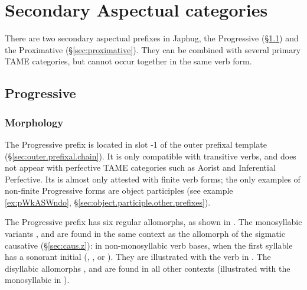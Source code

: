  \section{Secondary Aspectual categories} \label{sec:second.aspect}
There are two secondary aspectual prefixes in Japhug, the Progressive (§\ref{sec:progressive}) and the Proximative (§\ref{sec:proximative}). They can be combined with several primary TAME categories, but cannot occur together in the same verb form. 

\subsection{Progressive} \label{sec:progressive}

\subsubsection{Morphology} \label{sec:progressive.morphology}
The Progressive prefix  is located in slot -1 of the outer prefixal template (§\ref{sec:outer.prefixal.chain}). It is only compatible with transitive verbs, and does not appear with perfective TAME categories such as Aorist and Inferential Perfective. Its is almost only attested with finite verb forms; the only examples of non-finite Progressive forms are object participles (see example \ref{ex:pWkASWndo}, §\ref{sec:object.participle.other.prefixes}).

The Progressive prefix has six regular allomorphs, as shown in . The monosyllabic variants ,  and  are found in the same context as the  allomorph of the sigmatic causative (§\ref{sec:caus.z}): in non-monosyllabic verb bases, when the first syllable has a sonorant initial (, ,  or ). They are illustrated with the verb  in . The disyllabic allomorphs ,  and  are found in all other contexts (illustrated with the monosyllabic  in ).



